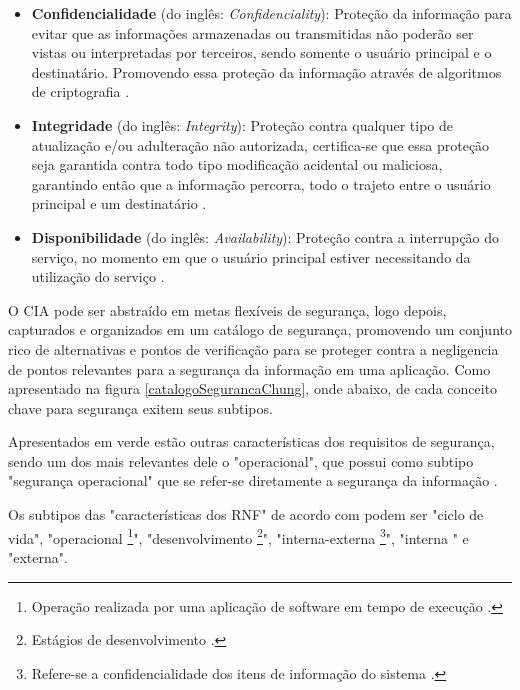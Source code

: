 \begin{itemize}
	\item \textbf{Confidencialidade} (do inglês: \textit{Confidenciality}): Proteção da informação para evitar que as informações armazenadas ou transmitidas não poderão ser vistas ou interpretadas por terceiros, sendo somente o usuário principal e o destinatário. Promovendo essa proteção da informação através de algoritmos de criptografia \cite{chung2012non} \cite{silva2007arquitetura}. 
	
	\item \textbf{Integridade} (do inglês: \textit{Integrity}): Proteção contra qualquer tipo de atualização e/ou adulteração não autorizada, certifica-se que essa proteção seja garantida contra todo tipo modificação acidental ou maliciosa, garantindo então que a informação percorra, todo o trajeto entre o usuário principal e um destinatário \cite{chung2012non} \cite{silva2007arquitetura}. 
	
	\item \textbf{Disponibilidade} (do inglês: \textit{Availability}): Proteção contra a interrupção do serviço, no momento em que o usuário principal estiver necessitando da utilização do serviço \cite{chung2012non} \cite{silva2007arquitetura}.
	  
\end{itemize}


O CIA pode ser abstraído em metas flexíveis de segurança, logo depois, capturados e organizados em um catálogo de segurança, promovendo um conjunto rico de alternativas e pontos de verificação para se proteger contra a negligencia de pontos relevantes para a segurança da informação em uma aplicação. Como apresentado na figura \ref{catalogoSegurancaChung}, onde abaixo, de cada conceito chave para segurança exitem seus subtipos. 

Apresentados em  verde estão outras características dos requisitos de segurança, sendo um dos mais relevantes dele o "operacional", que possui como subtipo "segurança operacional" que se refer-se diretamente a segurança da informação \cite{chung2012non}.

Os subtipos das "características dos RNF" de acordo com \cite{chung2012non} podem ser "ciclo de vida", "operacional \footnote[1]{Operação realizada por uma aplicação de software em tempo de execução \cite{chung2012non}.}", "desenvolvimento \footnote[2]{Estágios de desenvolvimento \cite{chung2012non}.}", "interna-externa \footnote[3]{Refere-se a confidencialidade dos itens de informação do sistema \cite{chung2012non}.}", "interna " e "externa".

